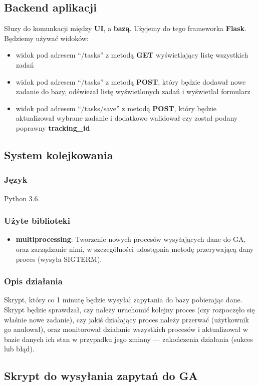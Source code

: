 \documentclass{article}
\begin{document}
\subsection{Backend aplikacji}
Słuzy do komunkacji między \textbf{UI}, a \textbf{bazą}. Użyjemy do tego frameworka \textbf{Flask}. Będziemy używać widoków:
\begin{itemize}
\item widok pod adresem ``/tasks'' z metodą \textbf{GET} wyświetlający listę wszystkich zadań
\item widok pod adresem ``/tasks'' z metodą \textbf{POST}, który będzie dodawał nowe zadanie do bazy, odświeżał listę wyświetlonych zadań i wyświetlał formularz
\item widok pod adresem ``/tasks/save'' z metodą \textbf{POST}, który będzie aktualizował wybrane zadanie i dodatkowo walidował czy został podany poprawny \textbf{tracking\_id}
\end{itemize}

\subsection{System kolejkowania}
\subsubsection{Język}
Python 3.6. 
\subsubsection{Użyte biblioteki}
\begin{itemize}
	\item \textbf{multiprocessing}: Tworzenie nowych procesów wysyłających dane do GA, oraz zarządzanie nimi, w szczególności udostępnia metodę przerywającą dany proces (wysyła SIGTERM).
\end{itemize}
\subsubsection{Opis działania}
Skrypt, który co 1 minutę będzie wysyłał zapytania do bazy pobierając dane. Skrypt będzie sprawdzał, czy należy uruchomić kolejny proces (czy rozpoczęło się właśnie nowe zadanie), czy jakiś działający proces należy przerwać (użytkownik go anulował), oraz monitorował działanie wszystkich procesów i aktualizował w bazie danych ich stan w przypadku jego zmiany --- zakończenia działania (sukces lub błąd).

\subsection{Skrypt do wysyłania zapytań do GA}
\end{document}
